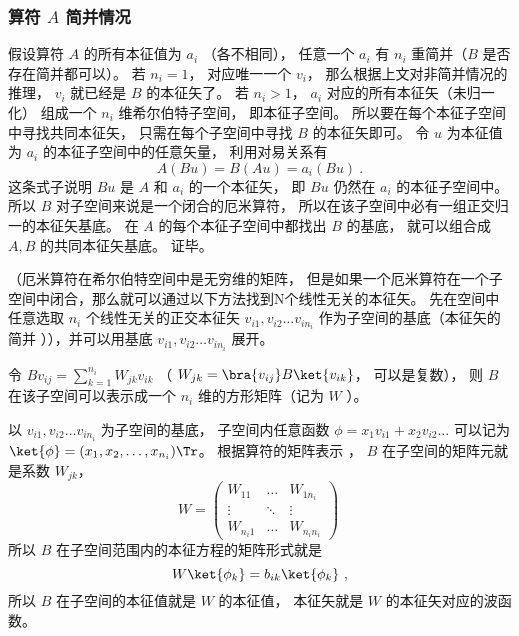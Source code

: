 \subsubsection{算符 $A$ 简并情况}
假设算符 $A$ 的所有本征值为 $a_i$ （各不相同）， 任意一个 $a_i$ 有 $n_i$ 重简并（$B$ 是否存在简并都可以）。 若 $n_i = 1$，  对应唯一一个 $v_i$，  那么根据上文对非简并情况的推理， $v_i$ 就已经是 $B$ 的本征矢了。 若 $n_i > 1$， $a_i$ 对应的所有本征矢（未归一化） 组成一个 $n_i$ 维希尔伯特子空间， 即本征子空间。 所以要在每个本征子空间中寻找共同本征矢， 只需在每个子空间中寻找 $B$ 的本征矢即可。 令 $u$ 为本征值为 $a_i$ 的本征子空间中的任意矢量， 利用对易关系有
\begin{equation}
A (B u) = B (A u) = a_i (B u)~.
\end{equation}
这条式子说明 $B u$ 是 $A$ 和 $a_i$ 的一个本征矢， 即 $B u$ 仍然在 $a_i$ 的本征子空间中。 所以 $B$ 对子空间来说是一个闭合的厄米算符， 所以在该子空间中必有一组正交归一的本征矢基底。 在 $A$ 的每个本征子空间中都找出 $B$ 的基底， 就可以组合成 $A, B$ 的共同本征矢基底。 证毕。


（厄米算符在希尔伯特空间中是无穷维的矩阵， 但是如果一个厄米算符在一个子空间中闭合，那么就可以通过以下方法找到N个线性无关的本征矢。%
先在空间中任意选取 $n_i$ 个线性无关的正交本征矢 $v_{i1}, v_{i2}\dots v_{i n_i}$ 作为子空间的基底（本征矢的简并%
）），并可以用基底 $v_{i1}, v_{i2}\dots v_{i n_i}$ 展开。

令 $B v_{ij} = \sum_{k=1}^{n_i} W_{jk}v_{ik}$ （ $W_{jk} = \bra{v_{ij}} B \ket{v_{ik}}$， 可以是复数）， 则 $B$ 在该子空间可以表示成一个 $n_i$ 维的方形矩阵（记为 $W$ ）。

以 $v_{i1}, v_{i2} \dots v_{i n_i}$ 为子空间的基底， 子空间内任意函数 $\phi  = x_1 v_{i1} + x_2 v_{i2}\dots$ 可以记为 $\ket{\phi} = (x_1, x_2, \dots, x_{n_i})\Tr$。 根据算符的矩阵表示
， $B$ 在子空间的矩阵元就是系数 $W_{jk}$， 
\begin{equation}
W = \begin{pmatrix}
W_{11} & \ldots & W_{1 n_i}\\
\vdots & \ddots & \vdots \\
W_{n_i 1} & \ldots & W_{n_i n_i}
\end{pmatrix}~
\end{equation}
所以 $B$ 在子空间范围内的本征方程的矩阵形式就是
\begin{equation}
W \ket{\phi_k} = b_{ik} \ket{\phi_k}~,
\end{equation}
所以 $B$ 在子空间的本征值就是 $W$ 的本征值， 本征矢就是 $W$ 的本征矢对应的波函数。

